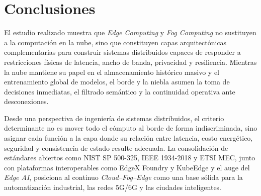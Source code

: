 \documentclass[12pt, letterpaper]{article}
\begin{document}
\section{Conclusiones}

El estudio realizado muestra que \textit{Edge Computing} y \textit{Fog Computing} no sustituyen a la computación en la nube, sino que constituyen capas arquitectónicas complementarias para construir sistemas distribuidos capaces de responder a restricciones físicas de latencia, ancho de banda, privacidad y resiliencia. Mientras la nube mantiene su papel en el almacenamiento histórico masivo y el entrenamiento global de modelos, el borde y la niebla asumen la toma de decisiones inmediatas, el filtrado semántico y la continuidad operativa ante desconexiones.

Desde una perspectiva de ingeniería de sistemas distribuidos, el criterio determinante no es mover todo el cómputo al borde de forma indiscriminada, sino asignar cada función a la capa donde su relación entre latencia, costo energético, seguridad y consistencia de estado resulte adecuada. La consolidación de estándares abiertos como NIST SP 500-325, IEEE 1934-2018 y ETSI MEC, junto con plataformas interoperables como EdgeX Foundry y KubeEdge y el auge del \textit{Edge AI}, posiciona al continuo \textit{Cloud--Fog--Edge} como una base sólida para la automatización industrial, las redes 5G/6G y las ciudades inteligentes.


\end{document}
